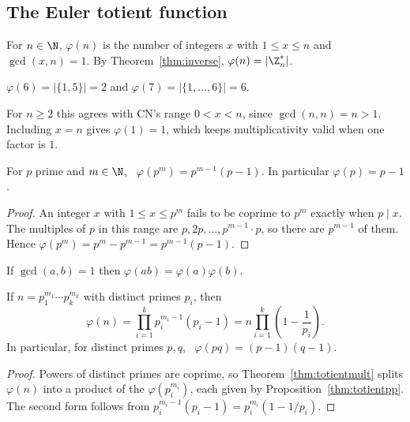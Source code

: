 \subsection{The Euler totient function}
\label{sec:7-12}

\begin{definition}\label{def:totient}
For $n\in\N$, $\varphi(n)$ is the number of integers $x$ with $1\le x\le n$ and $\gcd(x,n)=1$. By Theorem~\ref{thm:inverse}, $\varphi(n)=|\Z_n^*|$.
\end{definition}

\begin{example}
$\varphi(6)=|\{1,5\}|=2$ and $\varphi(7)=|\{1,\dots,6\}|=6$.
\end{example}

\begin{note}[Range of $x$]
For $n\ge2$ this agrees with CN's range $0<x<n$, since $\gcd(n,n)=n>1$. Including $x=n$ gives $\varphi(1)=1$, which keeps multiplicativity valid when one factor is $1$.
\end{note}

\begin{proposition}
\label{thm:totientpp}
For $p$ prime and $m\in\N$, \ $\varphi(p^m)=p^{m-1}(p-1)$. In particular $\varphi(p)=p-1$.
\end{proposition}
\begin{proof}
An integer $x$ with $1\le x\le p^m$ fails to be coprime to $p^m$ exactly when $p\mid x$. The multiples of $p$ in this range are $p,2p,\dots,p^{m-1}\cdot p$, so there are $p^{m-1}$ of them. Hence $\varphi(p^m)=p^m-p^{m-1}=p^{m-1}(p-1)$.
\end{proof}

\begin{theorem}[Multiplicativity]
\label{thm:totientmult}
If $\gcd(a,b)=1$ then $\varphi(ab)=\varphi(a)\varphi(b)$.
\end{theorem}

\begin{theorem}
\label{thm:totientformula}
If $n=p_1^{m_1}\cdots p_k^{m_k}$ with distinct primes $p_i$, then
\[
\varphi(n)=\prod_{i=1}^{k}p_i^{m_i-1}(p_i-1) = n\prod_{i=1}^{k}\left(1-\frac1{p_i}\right).
\]
In particular, for distinct primes $p,q$, \ $\varphi(pq)=(p-1)(q-1)$.
\end{theorem}
\begin{proof}
Powers of distinct primes are coprime, so Theorem~\ref{thm:totientmult} splits $\varphi(n)$ into a product of the $\varphi(p_i^{m_i})$, each given by Proposition~\ref{thm:totientpp}. The second form follows from $p_i^{m_i-1}(p_i-1)=p_i^{m_i}(1-1/p_i)$.
\end{proof}

